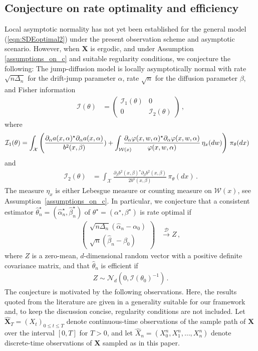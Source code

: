 \documentclass[11pt,a4paper]{article}
\newcommand{\thetan}{{\theta_0}}
\newcommand{\alphan}{{\alpha_0}}
\newcommand{\betan}{{\beta_0}}
\newcommand{\X}{{\mathbf X}}
\newcommand{\dd}{{\mathcal{D}}}
\newcommand{\ii}{{\mathcal{I}}}
\newcommand{\nn}{{\mathcal{N}}}
\newcommand{\xx}{{\mathcal{X}}}
\newcommand{\ww}{{\mathcal{W}}}
\numberwithin{equation}{section}
\numberwithin{theorem}{section}
\begin{document}
\subsection{Conjecture on rate optimality and efficiency}\label{condefs}
Local asymptotic normality has not yet been established for the general model (\ref{eqn:SDEoptimal2}) under the present observation scheme and asymptotic scenario. However, when $\X$ is ergodic, and under Assumption \ref{assumptions_on_c} and suitable regularity conditions, we conjecture the following: The jump-diffusion model is locally asymptotically normal with rate $\sqrt{n \Delta_n}$ for the drift-jump parameter $\alpha$, rate $\sqrt{n}$ for the diffusion parameter $\beta$, and Fisher information
\begin{align}
\ii(\theta) &= \begin{pmatrix} \ii_{1}(\theta) & 0 \\ 0 & \ii_{2}(\theta) \end{pmatrix}\,,
\label{eqn:Fisherinf} 
\end{align}
where
\begin{align}
\ii_{1}(\theta) &= \int_\xx\left( \frac{\partial_\alpha a(x, \alpha)^\star \partial_\alpha a(x,\alpha)}{b^2(x, \beta)} ) + \int_{\ww(x)}\hspace{-5mm} \frac{\partial_\alpha \varphi(x,w,\alpha)^\star \partial_\alpha \varphi(x,w, \alpha)}{\varphi(x,w,\alpha)}\,\eta_x(dw)\right)\, \pi_\theta(dx)
\label{I1}
\end{align}
and
\begin{align*}
  \mathcal{I}_{2}(\theta) &=  \int_\xx\frac{\partial_\beta b^2(x, \beta)^\star \partial_\beta b^2(x, \beta)}{2b^4(x, \beta)}\, \pi_\theta(dx)\,.
\end{align*}
The measure $\eta_x$ is either Lebesgue measure or counting measure on $\ww(x)$, see Assumption~\ref{assumptions_on_c}. In particular, we conjecture that a consistent estimator $\hat{\theta}^\star_n = (\hat{\alpha}^\star_n,\hat{\beta}^\star_n)$ of $\theta^\star = (\alpha^\star,\beta^\star)$ is rate optimal if
\begin{align}
\begin{pmatrix} \sqrt{n\Delta_n} (\hat{\alpha}_n -\alphan) \\
  \sqrt{n}(\hat{\beta}_n-\betan) \end{pmatrix}
&\overset{\dd}{\longrightarrow} Z \,,
\label{eqn:rateoptimality}
\end{align}
where $Z$ is a zero-mean, $d$-dimensional random vector with a positive definite covariance matrix, and that $\hat{\theta}_n$ is efficient if 
\begin{align}
Z \sim \nn_d(0,\ii(\thetan)^{-1} )\,.
\label{eqn:efficient}
\end{align}
%
The conjecture is motivated by the following observations. Here, the results quoted from the literature are given in a generality suitable for our framework and, to keep the discussion concise, regularity conditions are not included. Let $\widehat{\X}_T = (X_t)_{0 \leq t \leq T}$ denote continuous-time observations of the sample path of $\X$ over the interval $[0,T]$ for $T>0$, and let $\widehat{X}_n = (X_0^n, X_1^n, \ldots, X_n^n)$ denote discrete-time observations of $\X$ sampled as in this paper. \medskip
\end{document}
